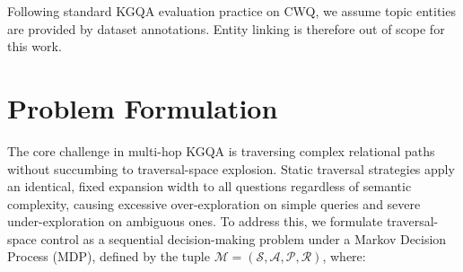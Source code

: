 \documentclass[10pt,conference]{IEEEtran}
\begin{document}
Following standard KGQA evaluation practice on CWQ, we assume topic entities are provided by dataset annotations. Entity linking is therefore out of scope for this work.



\section{Problem Formulation}
\label{sec:probform}

The core challenge in multi-hop KGQA is traversing complex relational paths without succumbing to traversal-space explosion. Static traversal strategies apply an identical, fixed expansion width to all questions regardless of semantic complexity, causing excessive over-exploration on simple queries and severe under-exploration on ambiguous ones. To address this, we formulate traversal-space control as a sequential decision-making problem under a Markov Decision Process (MDP), defined by the tuple $\mathcal{M}=(\mathcal{S},\mathcal{A},\mathcal{P},\mathcal{R})$, where:
\end{document}
